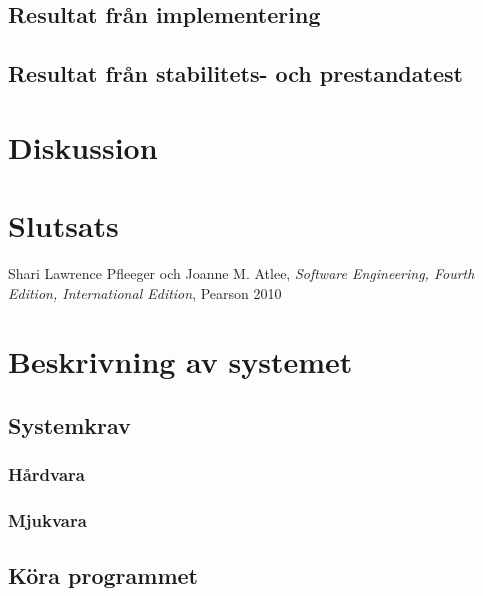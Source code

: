 \documentclass[a4paper,12pt,oneside,final,swedish]{extarticle}
\begin{document}
\subsection{Resultat från implementering}
\subsection{Resultat från stabilitets- och prestandatest}

\section{Diskussion}


\section{Slutsats}





\begin{thebibliography}{9}

Shari Lawrence Pfleeger och Joanne M. Atlee, \emph{Software Engineering, Fourth Edition, International Edition}, Pearson 2010
  
\end{thebibliography}

\appendix

\section{Beskrivning av systemet}
\subsection{Systemkrav}
\subsubsection{Hårdvara}
\subsubsection{Mjukvara}

\subsection{Köra programmet}
\end{document}

